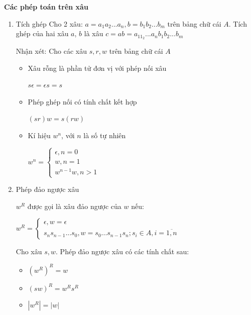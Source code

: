 \documentclass[14pt]{extreport}
\begin{document}
\textbf{Các phép toán trên xâu}
\begin{enumerate}
\item Tích ghép
Cho 2 xâu: $a=a_1a_2...a_n,b=b_1b_2...b_m$ trên bảng chữ cái $A$. Tích ghép của hai xâu $a$, $b$ là xâu $c=ab=a_11_2...a_nb_1b_2...b_m$

Nhận xét: Cho các xâu $s,r,w$ trên bảng chữ cái $A$
\begin{itemize}
\item Xâu rỗng là phần tử đơn vị với phép nối xâu

$s\epsilon =\epsilon s=s$
\item Phép ghép nối có tính chất kết hợp

$\left(sr\right)w=s\left(rw\right)$
\item Kí hiệu $w^n$, với $n$ là số tự nhiên

$w^n=\left\{\begin{matrix}
\epsilon ,n=0\\ 
w,n=1\\ 
w^{n-1}w, n>1
\end{matrix}\right.$
\end{itemize}
\item Phép đảo ngược xâu

$w^R$ được gọi là xâu đảo ngược của $w$ nếu:

$w^{R}=\left\{\begin{matrix}
\epsilon, w=\epsilon \\ 
s_ns_{n-1}...s_0, w=s_0...s_{n-1}s_n; s_i \in A,i=\overline{1,n}
\end{matrix}\right.$

Cho xâu $s,w$. Phép đảo ngược xâu có các tính chất sau:
\begin{itemize}
\item ${\left(w^R\right)}^R=w$
\item ${\left(sw\right)}^R=w^Rs^R$
\item $\left|w^R\right|=\left|w\right|$
\end{itemize}
\end{enumerate}
\end{document}
